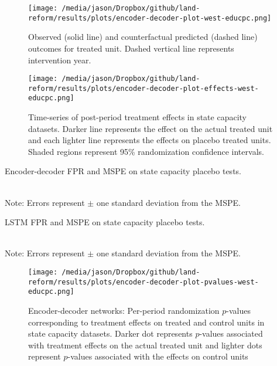 \documentclass[12pt]{article}
\begin{document}
\begin{figure*}[htbp]
	\centering
	\texttt{[image: /media/jason/Dropbox/github/land-reform/results/plots/encoder-decoder-plot-west-educpc.png]}
	\caption{Observed (solid line) and counterfactual predicted (dashed line) outcomes for treated unit. Dashed vertical line represents intervention year. \label{state-capacity-plot}}
\end{figure*}

\begin{figure*}[htbp]
		\centering
		\texttt{[image: /media/jason/Dropbox/github/land-reform/results/plots/encoder-decoder-plot-effects-west-educpc.png]}
		\caption{Time-series of post-period treatment effects in state capacity datasets. Darker line represents the effect on the actual treated unit and each lighter line represents the effects on placebo treated units. Shaded regions represent 95\% randomization confidence intervals. \label{state-capacity-plot-effects}}
\end{figure*}

\begin{table}[htbp]
	\begin{center}
		\caption{Encoder-decoder FPR and MSPE on state capacity placebo tests.\label{encoder-decoder-mpse}}
		\resizebox{\width}{!}{} \\
		\footnotesize{Note: Errors represent $\pm$ one standard deviation from the MSPE.}
	\end{center}
\end{table}

\begin{table}[htbp]
	\begin{center}
		\caption{LSTM FPR and MSPE on state capacity placebo tests.\label{lstm-mpse}}
		\resizebox{\width}{!}{} \\
		\footnotesize{Note: Errors represent $\pm$ one standard deviation from the MSPE.}
	\end{center}
\end{table}

\begin{figure*}[htbp]
		\centering
		\texttt{[image: /media/jason/Dropbox/github/land-reform/results/plots/encoder-decoder-plot-pvalues-west-educpc.png]}
	\caption{Encoder-decoder networks: Per-period randomization $p$-values corresponding to treatment effects on treated and control units in state capacity datasets. Darker dot represents $p$-values associated with treatment effects on the actual treated unit and lighter dots represent $p$-values associated with the effects on control units \label{state-capacity-plot-pvalues}}
\end{figure*}

\itemize
\end{document}

